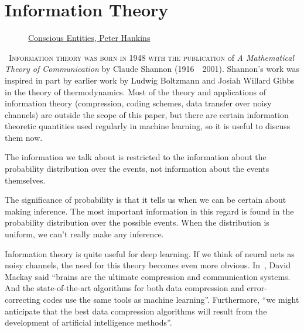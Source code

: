 \section{Information Theory}%
\label{sec:information-theory}

\vspace{1cm}

\begin{figure}[h]%
  \label{fig:info}
  \centering
  \caption{\href{https://www.consciousentities.com/2017/02/consciousness-entropy/}{Conscious
      Entities, Peter Hankins}}
\end{figure}

\vspace{1cm}

\lettrine[lines=3]{\Royal~I} {nformation theory was born in 1948 with
  the publication} of \textit{A Mathematical Theory of Communication}
by Claude Shannon (1916~\textendash~2001). Shannon's work was inspired
in part by earlier work by Ludwig Boltzmann and Josiah Willard Gibbs
in the theory of thermodynamics. Most of the theory and applications
of information theory (compression, coding schemes, data transfer over
noisy channels) are outside the scope of this paper, but there are
certain information theoretic quantities used regularly in machine
learning, so it is useful to discuss them now.

\begin{remark}
  The information we talk about is restricted to the information about
  the probability distribution over the events, not information about
  the events themselves.

  The significance of probability is that it tells us when we can be
  certain about making inference. The most important information in
  this regard is found in the probability distribution over the
  possible events. When the distribution is uniform, we can't really
  make any inference.
\end{remark}

Information theory is quite useful for deep learning. If we think of
neural nets as noisy channels, the need for this theory becomes even
more obvious. In~\cite{ref:mackay-2003}, David Mackay said ``brains
are the ultimate compression and communication systems. And the
state-of-the-art algorithms for both data compression and
error-correcting codes use the same tools as machine
learning''. Furthermore, ``we might anticipate that the best data
compression algorithms will result from the development of artificial
intelligence methods''.

